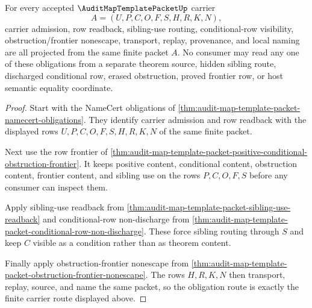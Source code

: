 \begin{theorem}
\label{thm:audit-map-template-packet-obligation-route}
For every accepted $\AuditMapTemplatePacketUp$ carrier
$$
A=(U,P,C,O,F,S,H,R,K,N),
$$
carrier admission, row readback, sibling-use routing, conditional-row visibility, obstruction/frontier nonescape, transport, replay, provenance, and local naming are all projected from the same finite packet $A$. No consumer may read any one of these obligations from a separate theorem source, hidden sibling route, discharged conditional row, erased obstruction, proved frontier row, or host semantic equality coordinate.
\end{theorem}
\begin{proof}
Start with the NameCert obligations of \autoref{thm:audit-map-template-packet-namecert-obligations}. They identify carrier admission and row readback with the displayed rows $U,P,C,O,F,S,H,R,K,N$ of the same finite packet.

Next use the row frontier of \autoref{thm:audit-map-template-packet-positive-conditional-obstruction-frontier}. It keeps positive content, conditional content, obstruction content, frontier content, and sibling use on the rows $P,C,O,F,S$ before any consumer can inspect them.

Apply sibling-use readback from \autoref{thm:audit-map-template-packet-sibling-use-readback} and conditional-row non-discharge from \autoref{thm:audit-map-template-packet-conditional-row-non-discharge}. These force sibling routing through $S$ and keep $C$ visible as a condition rather than as theorem content.

Finally apply obstruction-frontier nonescape from \autoref{thm:audit-map-template-packet-obstruction-frontier-nonescape}. The rows $H,R,K,N$ then transport, replay, source, and name the same packet, so the obligation route is exactly the finite carrier route displayed above.
\end{proof}


